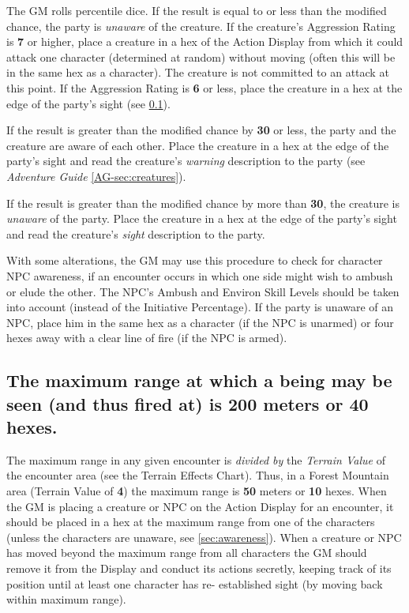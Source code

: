 The GM rolls percentile dice. If the result is equal to or less than
the modified chance, the party is \emph{unaware} of the creature. If
the creature's Aggression Rating is \textbf{7} or higher, place a
creature in a hex of the Action Display from which it could attack one
character (determined at random) without moving (often this will be in
the same hex as a character). The creature is not committed to an
attack at this point. If the Aggression Rating is \textbf{6} or less,
place the creature in a hex at the edge of the party's sight (see
\ref{sec:maximum-range}).

If the result is greater than the modified chance by \textbf{30} or less, the
party and the creature are aware of each other. Place the creature in
a hex at the edge of the party's sight and read the creature's \emph{warning}
description to the party (see \emph{Adventure Guide} \ref{AG-sec:creatures}).

If the result is greater than the modified chance by more than
\textbf{30}, the creature is \emph{unaware} of the party. Place the
creature in a hex at the edge of the party's sight and read the
creature's \emph{sight} description to the party.

With some alterations, the GM may use this procedure to check for
character NPC awareness, if an encounter occurs in which one side
might wish to ambush or elude the other. The NPC's Ambush and Environ
Skill Levels should be taken into account (instead of the Initiative
Percentage). If the party is unaware of an NPC, place him in the same
hex as a character (if the NPC is unarmed) or four hexes away with a
clear line of fire (if the NPC is armed).

\subsection[Maximum Range]{The maximum range at which a being may be
  seen (and thus fired at) is 200 meters or 40 hexes.} 
\label{sec:maximum-range}

The maximum range in any given encounter is \emph{divided by} the
\emph{Terrain Value} of the encounter area (see the Terrain Effects
Chart). Thus, in a Forest Mountain area (Terrain Value of \textbf{4})
the maximum range is \textbf{50} meters or \textbf{10} hexes. When the
GM is placing a creature or NPC on the Action Display for an
encounter, it should be placed in a hex at the maximum range from one
of the characters (unless the characters are unaware, see
\ref{sec:awareness}). When a creature or NPC has moved beyond the maximum
range from all characters the GM should remove it from the Display and
conduct its actions secretly, keeping track of its position until at
least one character has re- established sight (by moving back within
maximum range).

